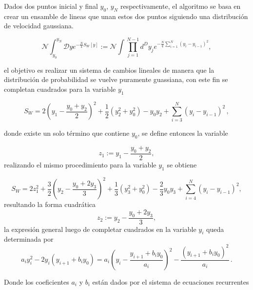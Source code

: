 Dados dos puntos inicial y final $ y_0$, $ y_N$ respectivamente, el algoritmo se basa en crear un ensamble de lineas que unan estos dos puntos siguiendo una distribución de velocidad gaussiana.
 


\begin{equation}
\mathcal{N} \int _{y_0} ^{y_N} \mathcal{D} y 
e^{-\frac{N}{4} S _{W} [y]} :=
\mathcal{N} \int \prod _{j=1} ^{N-1} d ^{D} y _{j} e^{- \frac{N}{4} \sum _{i=1} ^{N} ( y _i - y _{i-1} )^2 } ,
\label{eq.definicion_accion_discreta}
\end{equation}

el objetivo es realizar un sistema de cambios lineales de manera que la distribución de probabilidad se vuelve puramente guassiana, con este fin se completan cuadrados para la variable $ y_1$


\begin{equation}
S _{W} = 	2 \left( y _1 - \frac{y_0 + y_2}{2} \right) ^2 + 
			\frac{1}{2} \left( y ^2 _2 + y _0 ^2 \right)   -
			y _0 y_2 +
			\sum _{i = 3} ^{N} (y _i - y _{i-1}) ^2 
\, ,
\end{equation}

donde existe un solo término que contiene $y_0$, se define entonces la variable

\begin{equation}
z _1 := y_1 - \frac{y _0  + y_2 }{2} ,
\end{equation}
realizando el mismo procedimiento para la variable $y_1$ se obtiene


\begin{equation}
S _W = 2 z_1 ^2 +
		\frac{3}{2} \left( y _2 - \frac{y _0 + 2 y_3}{3} \right) ^2 +
		\frac{1}{3} \left( y _3 ^2 + y _0 ^2 \right) -
		\frac{2}{3} y_0 y_3 +
		\sum _{i = 4} ^{N} (y _i - y _{i-1}) ^2 
		,
\end{equation}
resultando la forma cuadrática
\begin{equation}
z _2 := y_2 - \frac{y _0  + 2 y_3 }{3} ,
\end{equation}
la expresión general luego de completar cuadrados en la variable $y_i$ queda determinada por 
\begin{equation}
a _i y _i ^2 - 2 y_i ( y _{i+1} + b _i y_0 ) =
a _i \left( y _i - \frac{y _{i+1} + b_i y_0}{a_i} \right) ^2 -
\frac{\left( y _{i+1} + b_i y_0 \right) ^2}{a _i}
\, .
\end{equation}


Donde los coeficientes $a_i$ y $b_i$ están dados por el sistema de ecuaciones recurrentes

